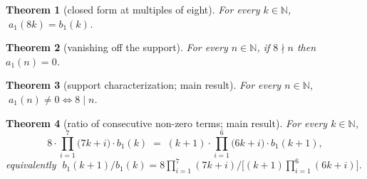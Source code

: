 \documentclass[11pt]{article}
\newtheorem{theorem}{Theorem}
\begin{document}
\begin{theorem}[closed form at multiples of eight]
\label{thm:t1a}
For every $k \in \mathbb{N}$, $\;a_1(8k) = b_1(k)$.
\end{theorem}

\begin{theorem}[vanishing off the support]
\label{thm:t1b}
For every $n \in \mathbb{N}$, if $8 \nmid n$ then $a_1(n) = 0$.
\end{theorem}

\begin{theorem}[support characterization; main result]
\label{thm:t1c}
For every $n \in \mathbb{N}$, $\;a_1(n) \neq 0 \iff 8 \mid n$.
\end{theorem}

\begin{theorem}[ratio of consecutive non-zero terms; main result]
\label{thm:t1d}
For every $k \in \mathbb{N}$,
\[
8 \cdot \prod_{i=1}^{7}\bigl(7k+i\bigr) \cdot b_1(k)
 \;=\; (k+1)\cdot \prod_{i=1}^{6}\bigl(6k+i\bigr) \cdot b_1(k+1),
\]
equivalently $\; b_1(k+1)/b_1(k) = 8\prod_{i=1}^{7}(7k+i) \big/ \bigl[(k+1)\prod_{i=1}^{6}(6k+i)\bigr]$.
\end{theorem}
\end{document}
